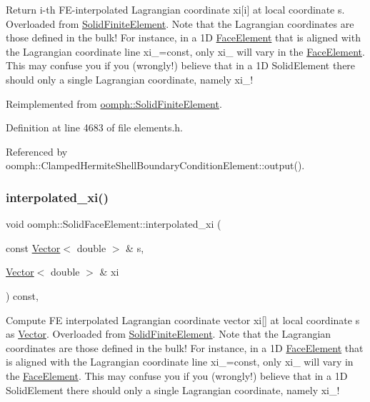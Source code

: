 Return i-\/th F\+E-\/interpolated Lagrangian coordinate xi\mbox{[}i\mbox{]} at local coordinate s. Overloaded from \hyperlink{classoomph_1_1SolidFiniteElement}{Solid\+Finite\+Element}. Note that the Lagrangian coordinates are those defined in the bulk! For instance, in a 1D \hyperlink{classoomph_1_1FaceElement}{Face\+Element} that is aligned with the Lagrangian coordinate line xi\+\_=const, only xi\+\_ will vary in the \hyperlink{classoomph_1_1FaceElement}{Face\+Element}. This may confuse you if you (wrongly!) believe that in a 1D Solid\+Element there should only a single Lagrangian coordinate, namely xi\+\_! 



Reimplemented from \hyperlink{classoomph_1_1SolidFiniteElement_a94ab4919b462d52cfdf6235bb9367d15}{oomph\+::\+Solid\+Finite\+Element}.



Definition at line 4683 of file elements.\+h.



Referenced by oomph\+::\+Clamped\+Hermite\+Shell\+Boundary\+Condition\+Element\+::output().

\mbox{\label{classoomph_1_1SolidFaceElement_ae1c414e42a48c736a9b634e922dbb314}} 
\subsubsection{\texorpdfstring{interpolated\+\_\+xi()}{interpolated\_xi()}\hspace{0.1cm}{\footnotesize\ttfamily [2/2]}}
{\footnotesize\ttfamily void oomph\+::\+Solid\+Face\+Element\+::interpolated\+\_\+xi (\begin{DoxyParamCaption}\item[{const \hyperlink{classoomph_1_1Vector}{Vector}$<$ double $>$ \&}]{s,  }\item[{\hyperlink{classoomph_1_1Vector}{Vector}$<$ double $>$ \&}]{xi }\end{DoxyParamCaption}) const\hspace{0.3cm}{\ttfamily [inline]}, {\ttfamily [virtual]}}



Compute FE interpolated Lagrangian coordinate vector xi\mbox{[}\mbox{]} at local coordinate s as \hyperlink{classoomph_1_1Vector}{Vector}. Overloaded from \hyperlink{classoomph_1_1SolidFiniteElement}{Solid\+Finite\+Element}. Note that the Lagrangian coordinates are those defined in the bulk! For instance, in a 1D \hyperlink{classoomph_1_1FaceElement}{Face\+Element} that is aligned with the Lagrangian coordinate line xi\+\_=const, only xi\+\_ will vary in the \hyperlink{classoomph_1_1FaceElement}{Face\+Element}. This may confuse you if you (wrongly!) believe that in a 1D Solid\+Element there should only a single Lagrangian coordinate, namely xi\+\_! 



